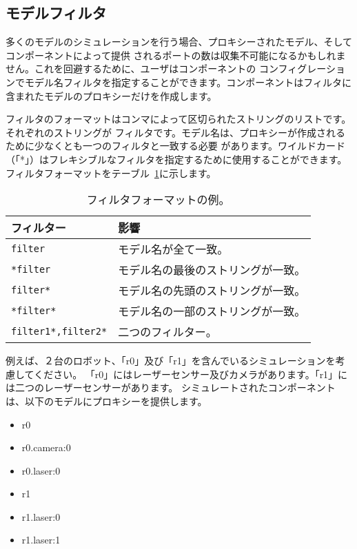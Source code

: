 \documentclass[a4paper,10pt]{article}
\newenvironment{Japanese}{%
  \CJKfamily{min}%
  \CJKtilde
  \CJKnospace}{}
\begin{document}
\begin{CJK}{UTF8}{}
\begin{Japanese}
\subsection{モデルフィルタ}
\label{sec1:filtering-models}

多くのモデルのシミュレーションを行う場合、プロキシーされたモデル、そしてコンポーネントによって提供
されるポートの数は収集不可能になるかもしれません。これを回避するために、ユーザはコンポーネントの
コンフィグレーションでモデル名フィルタを指定することができます。コンポーネントはフィルタに
含まれたモデルのプロキシーだけを作成します。

フィルタのフォーマットはコンマによって区切られたストリングのリストです。それぞれのストリングが
フィルタです。モデル名は、プロキシーが作成されるために少なくとも一つのフィルタと一致する必要
があります。ワイルドカード（「*」）はフレキシブルなフィルタを指定するために使用することができます。
フィルタフォーマットをテーブル~\ref{tab:filters}に示します。

\begin{table}[t]
  \centering
  \begin{tabularx}{0.6\columnwidth}{lX}
    \toprule
     フィルター & 影響 \\
    \midrule
    \verb|filter| & モデル名が全て一致。 \\
    \verb|*filter| & モデル名の最後のストリングが一致。 \\
    \verb|filter*| & モデル名の先頭のストリングが一致。 \\
    \verb|*filter*| & モデル名の一部のストリングが一致。 \\
    \verb|filter1*,filter2*| & 二つのフィルター。 \\
    \bottomrule
  \end{tabularx}
  \caption{フィルタフォーマットの例。}
  \label{tab:filters}
\end{table}

例えば、２台のロボット、「r0」及び「r1」を含んでいるシミュレーションを考慮してください。
「r0」にはレーザーセンサー及びカメラがあります。「r1」には二つのレーザーセンサーがあります。
シミュレートされたコンポーネントは、以下のモデルにプロキシーを提供します。

\begin{itemize}
  \item r0
  \item r0.camera:0
  \item r0.laser:0
  \item r1
  \item r1.laser:0
  \item r1.laser:1
\end{itemize}


\end{Japanese}
\end{CJK}
\end{document}
